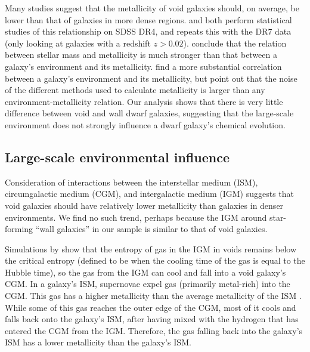 Many studies suggest that the metallicity of void galaxies should, on average, 
be lower than that of galaxies in more dense regions.  \cite{Mouhcine07} and 
\cite{Cooper08} both perform statistical studies of this relationship on SDSS 
DR4, and \cite{Deng11} repeats this with the DR7 data (only looking at galaxies 
with a redshift $z > 0.02$).  \cite{Mouhcine07} conclude that the relation 
between stellar mass and metallicity is much stronger than that between a 
galaxy's environment and its metallicity.  \cite{Cooper08} find a more 
substantial correlation between a galaxy's environment and its metallicity, but 
point out that the noise of the different methods used to calculate metallicity 
is larger than any environment-metallicity relation.  Our analysis shows that 
there is very little difference between void and wall dwarf galaxies, suggesting 
that the large-scale environment does not strongly influence a dwarf galaxy's 
chemical evolution.

\subsection{Large-scale environmental influence}

Consideration of interactions between the interstellar medium (ISM), 
circumgalactic medium (CGM), and intergalactic medium (IGM) suggests that void 
galaxies should have relatively lower metallicity than galaxies in denser 
environments.  We find no such trend, perhaps because the IGM around 
star-forming ``wall galaxies'' in our sample is similar to that of void 
galaxies.

Simulations by \cite{Cen11} show that the entropy of gas in the IGM in voids 
remains below the critical entropy (defined to be when the cooling time of the 
gas is equal to the Hubble time), so the gas from the IGM can cool and fall into 
a void galaxy's CGM.  In a galaxy's ISM, supernovae expel gas (primarily 
metal-rich) into the CGM.  This gas has a higher metallicity than the average 
metallicity of the ISM \citep[shown by][]{Muratov17}.  While some of this gas 
reaches the outer edge of the CGM, most of it cools and falls back onto the 
galaxy's ISM, after having mixed with the hydrogen that has entered the CGM from 
the IGM.  Therefore, the gas falling back into the galaxy's ISM has a lower 
metallicity than the galaxy's ISM.

